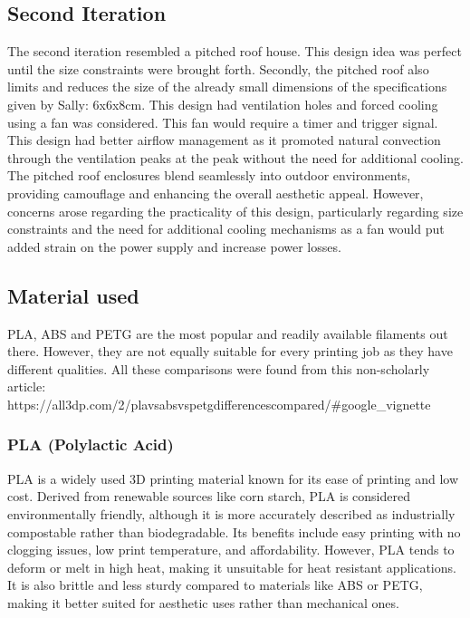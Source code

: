 \documentclass[class=report,11pt,crop=false]{standalone}
\begin{document}
\subsection{Second Iteration}
The second iteration resembled a pitched roof house. This design idea was perfect until the size constraints were brought forth. Secondly, the pitched roof also limits and reduces the size of the already small dimensions of the specifications given by Sally: 6x6x8cm. 
\newline
This design had ventilation holes and forced cooling using a fan was considered. This fan would require a timer and trigger signal. This design had better airflow management as it promoted natural convection through the ventilation peaks at the peak without the need for additional cooling. The pitched roof enclosures blend seamlessly into outdoor environments, providing camouflage and enhancing the overall aesthetic appeal. However, concerns arose regarding the practicality of this design, particularly regarding size constraints and the need for additional cooling mechanisms as a fan would put added strain on the power supply and increase power losses.
\newline

\subsection{Material used}
PLA, ABS and PETG are the most popular and readily available filaments out there. However, they are not equally suitable for every printing job as they have different qualities. All these comparisons were found from this non-scholarly article: https://all3dp.com/2/plavsabsvspetgdifferencescompared/#google_vignette
\newline

\subsubsection{PLA (Polylactic Acid)}
PLA is a widely used 3D printing material known for its ease of printing and low cost. Derived from renewable sources like corn starch, PLA is considered environmentally friendly, although it is more accurately described as industrially compostable rather than biodegradable. Its benefits include easy printing with no clogging issues, low print temperature, and affordability. However, PLA tends to deform or melt in high heat, making it unsuitable for heat resistant applications. It is also brittle and less sturdy compared to materials like ABS or PETG, making it better suited for aesthetic uses rather than mechanical ones.
\newline
\end{document}
